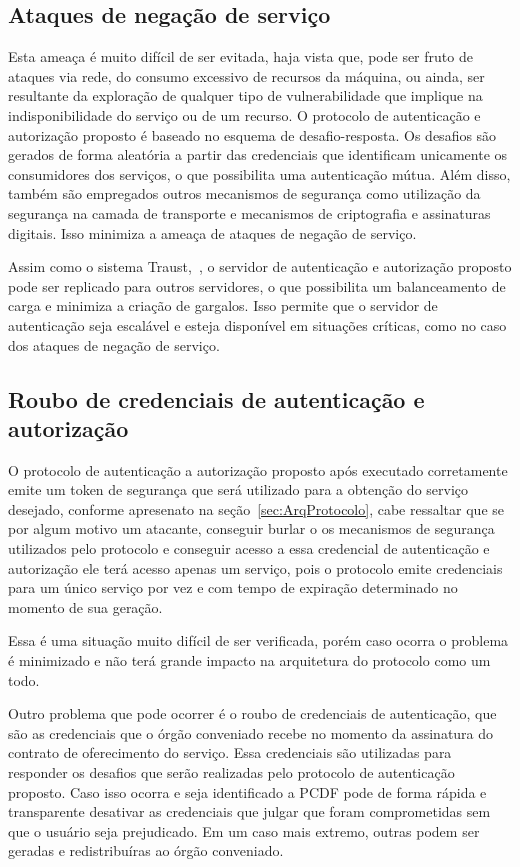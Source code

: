 \subsection{Ataques de negação de serviço}

Esta ameaça é muito difícil de ser evitada, haja vista que,  pode ser fruto de ataques via rede, do consumo excessivo de recursos da máquina,  ou ainda,  ser resultante da exploração de qualquer tipo de vulnerabilidade que implique na indisponibilidade do serviço ou de um recurso. O protocolo de autenticação e autorização proposto é baseado no esquema de desafio-resposta. Os desafios são gerados de forma aleatória a partir das credenciais que identificam unicamente os consumidores dos serviços, o que possibilita uma autenticação mútua. Além disso, também são empregados outros mecanismos de segurança como utilização da segurança na camada de transporte e mecanismos de criptografia e assinaturas digitais. Isso minimiza a ameaça de ataques de negação de serviço.

Assim como o sistema Traust,~\cite{traust08}, o servidor de autenticação e autorização proposto pode ser replicado para outros servidores, o que possibilita um balanceamento de carga e minimiza a criação de gargalos. Isso permite que o servidor de autenticação seja escalável e esteja disponível em situações críticas, como no caso dos ataques de negação de serviço.


\subsection{Roubo de credenciais de autenticação e autorização}\label{subsec:RouboCred}

O protocolo de autenticação a autorização proposto após executado corretamente emite um token de segurança que será utilizado para a obtenção do serviço desejado, conforme apresenato na seção~\ref{sec:ArqProtocolo}, cabe ressaltar que se por algum motivo um atacante, conseguir burlar o os mecanismos de segurança utilizados pelo protocolo e conseguir acesso a essa credencial de autenticação e autorização ele terá acesso apenas um serviço, pois o protocolo emite credenciais para um único serviço por vez e com tempo de expiração determinado no momento de sua geração.

Essa é uma situação muito difícil de ser verificada, porém caso ocorra o problema é minimizado e não terá grande impacto na arquitetura do protocolo como um todo.

Outro problema que pode ocorrer é o roubo de credenciais de autenticação, que são as credenciais que o órgão conveniado recebe no momento da assinatura do contrato de oferecimento do serviço. Essa credenciais são utilizadas para responder os desafios que serão realizadas pelo protocolo de autenticação proposto. Caso isso ocorra e seja identificado a PCDF pode de forma rápida e transparente desativar as credenciais que julgar que foram comprometidas sem que o usuário seja prejudicado. Em um caso mais extremo, outras podem ser geradas e redistribuíras ao órgão conveniado.

